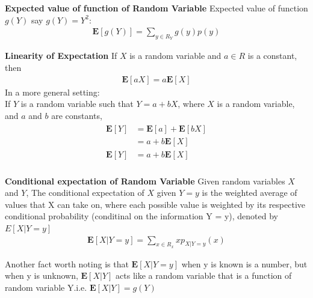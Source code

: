 \documentclass[10pt,a4paper]{article}
\begin{document}
	\begin{defn}{\textbf{Expected value of function of Random Variable}}
		Expected value of function $g(Y)$ say
		$g(Y) = Y^2$:
		\begin{align}
			\mathbf{E}[g(Y)] = \sum_{y \in R_Y}g(y)p(y)
		\end{align}
	\end{defn}

	\begin{defn}{\textbf{Linearity of Expectation}}
		If $X$ is a random variable and $a \in R$ is a constant, then
		\begin{align}
			\mathbf{E}[aX] = a\mathbf{E}[X]
		\end{align}
		In a more general setting:\\
		If $Y$ is a random variable such that $Y = a + bX$, where 
		$X$ is a random variable, and $a$ and $b$ are constants,
		\begin{align}
			\begin{split}
				\mathbf{E}[Y] & = \mathbf{E}[a] + \mathbf{E}[bX] \\
				     & = a + b\mathbf{E}[X] \\
				\mathbf{E}[Y] & = a + b\mathbf{E}[X] \\
			\end{split}
		\end{align}
		
	\end{defn}

	\begin{defn}{\textbf{Conditional expectation of Random Variable}}
		Given random variables $X$ and $Y$, The conditional expectation of $X$ given $Y = y$ is the weighted average of values that X can take on, where each possible value is weighted by its respective conditional probability (conditinal on the information Y = y), denoted by $E[X|Y = y]$
		\begin{align}
			\mathbf{E}[X|Y = y] = \sum_{x \in R_x} xp_{X|Y = y}(x)
		\end{align}
		
		Another fact worth noting is that $\mathbf{E}[X|Y=y]$ when y is known is a number, but when y is unknown, $\mathbf{E}[X|Y]$ acts like a random variable that is a function of random variable Y.i.e. $\mathbf{E}[X|Y] = g(Y)$
	\end{defn}
\end{document}
